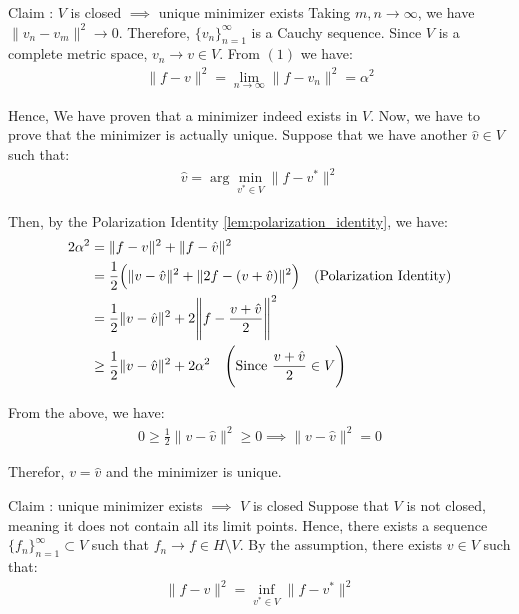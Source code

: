 \begin{proof*}
\begin{subproof}{Claim : $V$ is closed $\implies$ unique minimizer exists}
        \noindent Taking $m, n \to \infty$, we have $\|v_n-v_m\|^2\to 0$. Therefore, $\{v_n\}_{n=1}^\infty$ is a Cauchy sequence. Since $V$ is a complete metric space, $v_n \to v \in V$. From $(1)$ we have:
        \begin{align*}
            \|f - v\|^2 = \lim_{n\to\infty} \|f - v_n\|^2 = \alpha^2 
        \end{align*}

        \noindent Hence, We have proven that a minimizer indeed exists in $V$. Now, we have to prove that the minimizer is actually unique. Suppose that we have another $\hat v \in V$ such that:
        \begin{align*}
            \hat v = \arg\min_{v^*\in V} \|f - v^*\|^2
        \end{align*}

        \noindent Then, by the Polarization Identity \ref{lem:polarization_identity}, we have:
        \begin{align*}
            2\alpha^2 &= \|f - v\|^2 + \|f - \hat v\|^2 \\
                &= \frac{1}{2}\bigRound{\|v - \hat v\|^2 + \| 2f - (v + \hat v) \|^2} \ \ \ \text{(Polarization Identity)} \\
                &= \frac{1}{2} \|v - \hat v \|^2 + 2\Bigg\| f - \frac{v + \hat v}{2} \Bigg\|^2 \\
                &\ge \frac{1}{2} \|v - \hat v \|^2 + 2\alpha^2 \ \ \ \Bigg( \text{Since } \frac{v+\hat v}{2} \in V \Bigg)
        \end{align*}

        \noindent From the above, we have:
        \begin{align*}
            0 \ge \frac{1}{2} \|v - \hat v \|^2 \ge 0 \implies \|v - \hat v \|^2 = 0
        \end{align*}

        \noindent Therefor, $v = \hat v$ and the minimizer is unique.
    \end{subproof}

    \begin{subproof}{\newline Claim : unique minimizer exists $\implies$ $V$ is closed}
        Suppose that $V$ is not closed, meaning it does not contain all its limit points. Hence, there exists a sequence $\{f_n\}_{n=1}^\infty \subset V$ such that $f_n \to f \in H \setminus V$. By the assumption, there exists $v\in V$ such that:
        \begin{align*}
            \|f - v\|^2 = \inf_{v^*\in V}\|f - v^*\|^2
        \end{align*}


\end{subproof}
\end{proof*}
